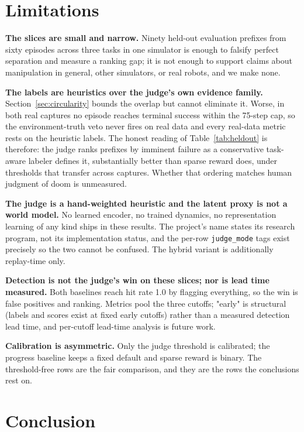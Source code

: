 \documentclass[11pt]{article}
\newcommand{\judgemode}[1]{\texttt{#1}}
\begin{document}
\section{Limitations}
\label{sec:limitations}

\textbf{The slices are small and narrow.} Ninety held-out evaluation prefixes from sixty
episodes across three tasks in one simulator is enough to falsify perfect separation and
measure a ranking gap; it is not enough to support claims about manipulation in general,
other simulators, or real robots, and we make none.

\textbf{The labels are heuristics over the judge's own evidence family.}
Section~\ref{sec:circularity} bounds the overlap but cannot eliminate it. Worse, in both
real captures no episode reaches terminal success within the 75-step cap, so the
environment-truth veto never fires on real data and every real-data metric rests on the
heuristic labels. The honest reading of Table~\ref{tab:heldout} is therefore: the judge
ranks prefixes by imminent failure as a conservative task-aware labeler defines it,
substantially better than sparse reward does, under thresholds that transfer across
captures. Whether that ordering matches human judgment of doom is unmeasured.

\textbf{The judge is a hand-weighted heuristic and the latent proxy is not a world model.}
No learned encoder, no trained dynamics, no representation learning of any kind ships in
these results. The project's name states its research program, not its implementation
status, and the per-row \judgemode{judge\_mode} tags exist precisely so the two cannot be
confused. The hybrid variant is additionally replay-time only.

\textbf{Detection is not the judge's win on these slices; nor is lead time measured.} Both
baselines reach hit rate 1.0 by flagging everything, so the win is false positives and
ranking. Metrics pool the three cutoffs; "early" is structural (labels and scores exist at
fixed early cutoffs) rather than a measured detection lead time, and per-cutoff lead-time
analysis is future work.

\textbf{Calibration is asymmetric.} Only the judge threshold is calibrated; the progress
baseline keeps a fixed default and sparse reward is binary. The threshold-free rows are the
fair comparison, and they are the rows the conclusions rest on.

\section{Conclusion}
\label{sec:conclusion}
\end{document}
